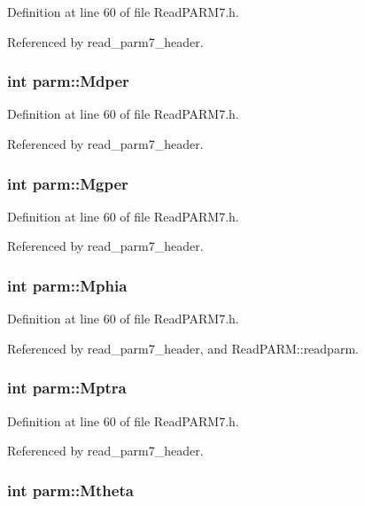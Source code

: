 Definition at line 60 of file Read\-PARM7.h.

Referenced by read\_\-parm7\_\-header.
\subsubsection{\setlength{\rightskip}{0pt plus 5cm}int parm::Mdper}\label{structparm_m98}




Definition at line 60 of file Read\-PARM7.h.

Referenced by read\_\-parm7\_\-header.
\subsubsection{\setlength{\rightskip}{0pt plus 5cm}int parm::Mgper}\label{structparm_m97}




Definition at line 60 of file Read\-PARM7.h.

Referenced by read\_\-parm7\_\-header.
\subsubsection{\setlength{\rightskip}{0pt plus 5cm}int parm::Mphia}\label{structparm_m11}




Definition at line 60 of file Read\-PARM7.h.

Referenced by read\_\-parm7\_\-header, and Read\-PARM::readparm.
\subsubsection{\setlength{\rightskip}{0pt plus 5cm}int parm::Mptra}\label{structparm_m90}




Definition at line 60 of file Read\-PARM7.h.

Referenced by read\_\-parm7\_\-header.
\subsubsection{\setlength{\rightskip}{0pt plus 5cm}int parm::Mtheta}\label{structparm_m9}




